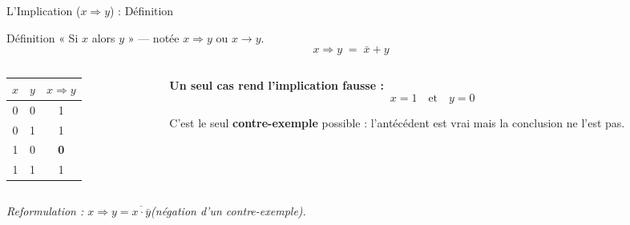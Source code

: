 \begin{frame}{L'Implication (\(x \Rightarrow y\)) : Définition}

    \begin{block}{Définition}
        « Si \(x\) alors \(y\) » — notée \(x \Rightarrow y\) ou \(x \to y\).
        \[
            x \Rightarrow y \;=\; \bar{x} + y
        \]
    \end{block}

    \vspace{0.4cm}

    \begin{columns}[T]
        \begin{column}{0.42\textwidth}
            \centering
            \begin{tabular}{|c|c|c|}
                \hline
                \(x\) & \(y\) & \(x \Rightarrow y\) \\
                \hline
                0 & 0 & 1 \\
                0 & 1 & 1 \\
                1 & 0 & \textbf{0} \\
                1 & 1 & 1 \\
                \hline
            \end{tabular}
        \end{column}
        \begin{column}{0.55\textwidth}
            \textbf{Un seul cas rend l'implication fausse :}
            \[
                x = 1 \quad \text{et} \quad y = 0
            \]

            \vspace{0.3cm}
            C'est le seul \textbf{contre-exemple} possible : l'antécédent est vrai mais la conclusion ne l'est pas.
        \end{column}
    \end{columns}

    \vspace{0.3cm}
    \centering
    \textit{Reformulation : \(x \Rightarrow y = \overline{x \cdot \bar{y}}\)\quad (négation d'un contre-exemple).}

\end{frame}

